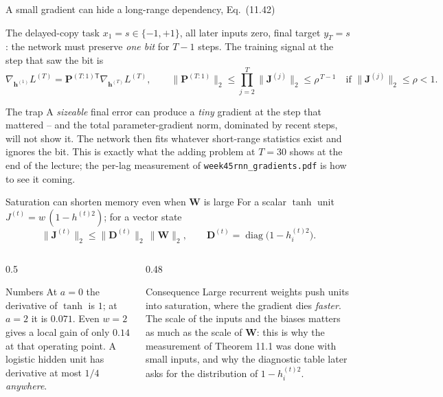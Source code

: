 \documentclass[10pt,aspectratio=169]{beamer}
\begin{document}
\begin{frame}{A small gradient can hide a long-range dependency, Eq.~(11.42)}
\begin{block}{The delayed-copy task}
$x_1=s\in\{-1,+1\}$, all later inputs zero, final target $y_T=s$: the network
must preserve \emph{one bit} for $T-1$ steps.  The training signal at the
step that saw the bit is
\[
  \nabla_{\bm{h}^{(1)}}L^{(T)}=\bm{P}^{(T:1)\mathsf{T}}\nabla_{\bm{h}^{(T)}}L^{(T)},\qquad
  \|\bm{P}^{(T:1)}\|_2\le\prod_{j=2}^{T}\|\bm{J}^{(j)}\|_2\le\rho^{\,T-1}
  \quad\text{if }\|\bm{J}^{(j)}\|_2\le\rho<1 .
\]
\end{block}
\begin{block}{The trap}
A \emph{sizeable} final error can produce a \emph{tiny} gradient at the step
that mattered -- and the total parameter-gradient norm, dominated by recent
steps, will not show it.  The network then fits whatever short-range
statistics exist and ignores the bit.  This is exactly what the adding
problem at $T=30$ shows at the end of the lecture; the per-lag measurement of
\texttt{week45rnn\_gradients.pdf} is how to see it coming.
\end{block}
\end{frame}

\begin{frame}{Saturation can shorten memory even when $\bm{W}$ is large}
For a scalar $\tanh$ unit $J^{(t)}=w\,(1-h^{(t)2})$; for a vector state
\[
  \|\bm{J}^{(t)}\|_2\le\|\bm{D}^{(t)}\|_2\,\|\bm{W}\|_2,\qquad
  \bm{D}^{(t)}=\operatorname{diag}\bigl(1-h^{(t)2}_i\bigr).
\]
\begin{columns}[T]
\begin{column}{0.5\textwidth}
\begin{block}{Numbers}
At $a=0$ the derivative of $\tanh$ is $1$; at $a=2$ it is $0.071$.  Even
$w=2$ gives a local gain of only $0.14$ at that operating point.  A logistic
hidden unit has derivative at most $1/4$ \emph{anywhere}.
\end{block}
\end{column}
\begin{column}{0.48\textwidth}
\begin{block}{Consequence}
Large recurrent weights push units into saturation, where the gradient dies
\emph{faster}.  The scale of the inputs and the biases matters as much as
the scale of $\bm{W}$: this is why the measurement of Theorem 11.1 was done
with small inputs, and why the diagnostic table later asks for the
distribution of $1-h_i^{(t)2}$.
\end{block}
\end{column}
\end{columns}
\end{frame}
\end{document}
